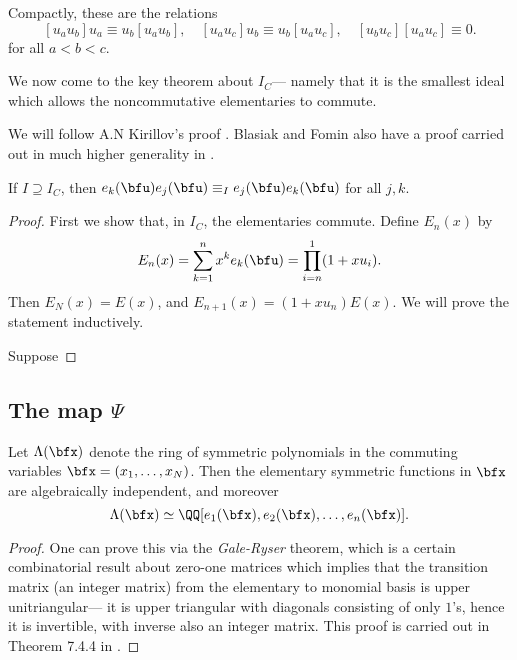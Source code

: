 \documentclass{article}
\begin{document}
Compactly, these are the relations
\[
    [u_au_b]u_a \equiv u_b[u_au_b], \quad
    [u_au_c]u_b \equiv u_b[u_au_c], \quad
    [u_bu_c][u_au_c] \equiv 0.
\]
for all $a<b<c$.

We now come to the key theorem about $I_C$--- namely that it is the smallest ideal which allows the noncommutative elementaries to commute.

We will follow A.N Kirillov's proof \cite[Theorem 2.26]{K16}.
Blasiak and Fomin also have a proof carried out in much higher generality in \cite{BF18}.

\begin{theorem}
    \label{thm:ICImpliesEsCommute}
    If $I \supseteq I_C$, then $e_k(\bfu)e_j(\bfu) \equiv_I e_j(\bfu)e_k(\bfu)$ for all $j,k$. 
\end{theorem}

\begin{proof}
    First we show that, in $I_C$, the elementaries commute.
    Define $E_n(x)$ by
    \[
        E_n(x)
        =
        \sum_{k=1}^n
        x^k e_k(\bfu)
        =
        \prod_{i=n}^1
        (1 + xu_i).
    \]
    Then $E_N(x) = E(x)$, and $E_{n+1}(x) = (1+xu_n)E(x)$.
    We will prove the statement inductively.

    Suppose 
\end{proof}

\subsection{
    The map $\Psi$
}

\begin{theorem}
    \label{thm:FundThmSymFuncs}
    Let $\Lambda(\bfx)$ denote the ring of symmetric polynomials in the commuting variables $\bfx = (x_1,\ldots,x_N)$.
    Then the elementary symmetric functions in $\bfx$ are algebraically independent, and moreover
    \[
        \Lambda(\bfx)
        \simeq
        \QQ[e_1(\bfx), e_2(\bfx), \ldots, e_n(\bfx)].
    \]
\end{theorem}

\begin{proof}
    One can prove this via the \textit{Gale-Ryser} theorem, which is a certain combinatorial result about zero-one matrices which implies that the transition matrix (an integer matrix) from the elementary to monomial basis is upper unitriangular--- it is upper triangular with diagonals consisting of only $1$'s, hence it is invertible, with inverse also an integer matrix.
    This proof is carried out in Theorem 7.4.4 in \cite{EC2}.
\end{proof}
\end{document}
